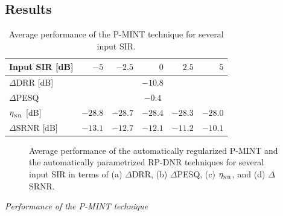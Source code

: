 \documentclass{aes60i}
\begin{document}
\subsection{Results}
\label{sec: exp}

\begin{table}[t]
\begin{center}
  \caption{Average performance of the P-MINT technique for several input SIR.}
  \label{tbl: perf_pmint}
  \begin{tabularx}{\linewidth}{Xrrrrr}
    \toprule
     Input SIR [dB] & $-5$ & $-2.5$ & $0$ & $2.5$ & $5$ \\
    \midrule
    $\Delta$DRR [dB] & \multicolumn{5}{c}{$-10.8$} \\
    $\Delta$PESQ & \multicolumn{5}{c}{$-0.4$} \\
    $\eta_{_{\rm NR}}$ [dB] & $-28.8$ & $-28.7$ & $-28.4$ & $-28.3$ & $-28.0$ \\
    $\Delta$SRNR [dB] & $-13.1$ & $-12.7$ & $-12.1$ & $-11.2$ & $-10.1$ \\
    \bottomrule
  \end{tabularx}
\end{center}
\end{table}
\begin{figure}[t]
\centering
\subfloat[\label{fig: ddrr}]{%

}
\subfloat[\label{fig: dpesq}]{%

}
\subfloat[\label{fig: nr}]{%
\hspace{-1.5cm}
}
\subfloat[\label{fig: dsrnr}]{%

}
\caption{Average performance of the automatically regularized P-MINT and the automatically parametrized RP-DNR techniques for several input SIR in terms of (a) $\Delta$DRR, (b) $\Delta$PESQ, (c) $\eta_{_{\rm NR}}$, and (d) $\Delta$SRNR.}
\label{fig: perf_all}
\end{figure}
\textit{Performance of the P-MINT technique}
\end{document}
